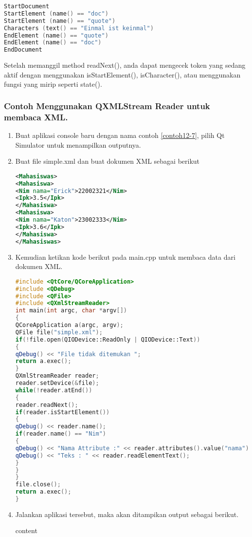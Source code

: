 \begin{lstlisting}[language=c++, numbers=none]
StartDocument
StartElement (name() == "doc")
StartElement (name() == "quote")
Characters (text() == "Einmal ist keinmal")
EndElement (name() == "quote")
EndElement (name() == "doc")
EndDocument
\end{lstlisting}

Setelah memanggil method readNext(), anda dapat mengecek token yang
sedang aktif dengan menggunakan isStartElement(), isCharacter(), atau
menggunakan fungsi yang mirip seperti state().

\subsubsection*{Contoh  Menggunakan QXMLStream Reader untuk membaca XML.}

\begin{enumerate}
\item
  Buat aplikasi console baru dengan nama contoh \ref{contoh12-7}, pilih Qt Simulator
  untuk menampilkan outputnya.
\item
  Buat file simple.xml dan buat dokumen XML sebagai berikut

\begin{lstlisting}[language=xml]
<Mahasiswas>
<Mahasiswa>
<Nim nama="Erick">22002321</Nim>
<Ipk>3.5</Ipk>
</Mahasiswa>
<Mahasiswa>
<Nim nama="Katon">23002333</Nim>
<Ipk>3.6</Ipk>
</Mahasiswa>
</Mahasiswas>
\end{lstlisting}
\item
  Kemudian ketikan kode berikut pada main.cpp untuk membaca data dari
  dokumen XML.

\begin{lstlisting}[language=c++, caption=Menggunakan QXMLStream Reader untuk membaca XML, label=contoh12-7]
#include <QtCore/QCoreApplication>
#include <QDebug>
#include <QFile>
#include <QXmlStreamReader>
int main(int argc, char *argv[])
{
QCoreApplication a(argc, argv);
QFile file("simple.xml");
if(!file.open(QIODevice::ReadOnly | QIODevice::Text))
{
qDebug() << "File tidak ditemukan ";
return a.exec();
}
QXmlStreamReader reader;
reader.setDevice(&file);
while(!reader.atEnd())
{
reader.readNext();
if(reader.isStartElement())
{
qDebug() << reader.name();
if(reader.name() == "Nim")
{
qDebug() << "Nama Attribute :" << reader.attributes().value("nama");
qDebug() << "Teks : " << reader.readElementText();
}
}
}
file.close();
return a.exec();
}
\end{lstlisting}
\item
  Jalankan aplikasi tersebut, maka akan ditampikan output sebagai
  berikut.
  \begin{lcverbatim}
  	content
  \end{lcverbatim}
\end{enumerate}

